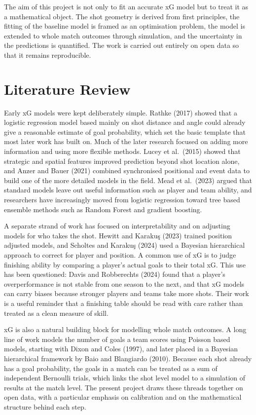 \documentclass[11pt]{article}
\begin{document}
The aim of this project is not only to fit an accurate xG model but to treat it
as a mathematical object. The shot geometry is derived from first principles, the
fitting of the baseline model is framed as an optimisation problem, the model is
extended to whole match outcomes through simulation, and the uncertainty in the
predictions is quantified. The work is carried out entirely on open data so that
it remains reproducible.

\section{Literature Review}

Early xG models were kept deliberately simple. Rathke (2017) showed that a
logistic regression model based mainly on shot distance and angle could already
give a reasonable estimate of goal probability, which set the basic template that
most later work has built on. Much of the later research focused on adding more
information and using more flexible methods. Lucey et al.\ (2015) showed that
strategic and spatial features improved prediction beyond shot location alone, and
Anzer and Bauer (2021) combined synchronised positional and event data to build
one of the more detailed models in the field. Mead et al.\ (2023) argued that
standard models leave out useful information such as player and team ability, and
researchers have increasingly moved from logistic regression toward tree based
ensemble methods such as Random Forest and gradient boosting.

A separate strand of work has focused on interpretability and on adjusting models
for who takes the shot. Hewitt and Karaku\c{s} (2023) trained position adjusted
models, and Scholtes and Karaku\c{s} (2024) used a Bayesian hierarchical approach
to correct for player and position. A common use of xG is to judge finishing
ability by comparing a player's actual goals to their total xG. This use has been
questioned: Davis and Robberechts (2024) found that a player's overperformance is
not stable from one season to the next, and that xG models can carry biases
because stronger players and teams take more shots. Their work is a useful
reminder that a finishing table should be read with care rather than treated as a
clean measure of skill.

xG is also a natural building block for modelling whole match outcomes. A long
line of work models the number of goals a team scores using Poisson based models,
starting with Dixon and Coles (1997), and later placed in a Bayesian hierarchical
framework by Baio and Blangiardo (2010). Because each shot already has a goal
probability, the goals in a match can be treated as a sum of independent Bernoulli
trials, which links the shot level model to a simulation of results at the match
level. The present project draws these threads together on open data, with a
particular emphasis on calibration and on the mathematical structure behind each
step.
\end{document}
